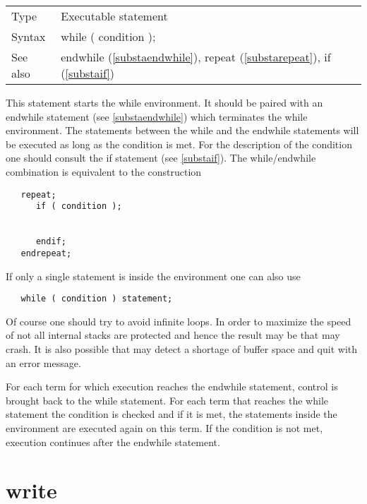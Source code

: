 \noindent \begin{tabular}{ll}
Type & Executable statement\\
Syntax & while ( condition );
\\ See also & endwhile (\ref{substaendwhile}), repeat (\ref{substarepeat}),
            if (\ref{substaif})
\end{tabular} \vspace{4mm}

\noindent This statement starts the while 
environment. It should be paired with an 
endwhile statement (see \ref{substaendwhile}) which 
terminates the while environment. The statements between the while and the 
endwhile statements will be executed as long as the condition is met. For 
the description of the condition one should consult the if 
statement (see \ref{substaif}). The while/endwhile combination is 
equivalent to the construction
\begin{verbatim}
   repeat;
      if ( condition );


      endif;
   endrepeat;
\end{verbatim}
If only a single statement is inside the environment one can also use
\begin{verbatim}
   while ( condition ) statement;
\end{verbatim}
Of course one should try to avoid infinite 
loops. In order to maximize the speed of {\FORM} not 
all internal stacks are protected and hence the result may be that {\FORM} 
may crash. It is also possible that {\FORM} may detect a shortage of buffer 
space and quit with an error message. \vspace{4mm}

\noindent For each term for which execution reaches the endwhile statement, 
control is brought back to the while statement. For each term that reaches 
the while statement the condition is checked and if it is met, the 
statements inside the environment are executed again on this term. If the 
condition is not met, execution continues after the endwhile statement. 
\vspace{10mm}


\section{write}
\label{substawrite}

